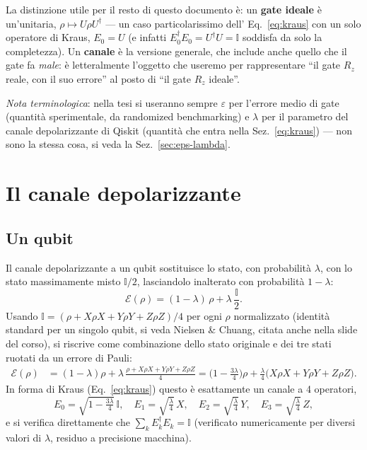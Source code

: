 \documentclass[11pt,a4paper]{article}
\begin{document}
La distinzione utile per il resto di questo documento è: un \textbf{gate ideale} è
un'unitaria, $\rho\mapsto U\rho U^\dagger$ --- un caso particolarissimo dell'
Eq.~\eqref{eq:kraus} con un solo operatore di Kraus, $E_0=U$ (e infatti
$E_0^\dagger E_0=U^\dagger U=\mathbb I$ soddisfa da solo la completezza). Un
\textbf{canale} è la versione generale, che include anche quello che il gate fa
\emph{male}: è letteralmente l'oggetto che useremo per rappresentare ``il gate $R_z$
reale, con il suo errore'' al posto di ``il gate $R_z$ ideale''.

\emph{Nota terminologica}: nella tesi si useranno sempre $\varepsilon$ per l'errore
medio di gate (quantità sperimentale, da randomized benchmarking) e $\lambda$ per il
parametro del canale depolarizzante di Qiskit (quantità che entra nella
Sez.~\eqref{eq:kraus}) --- non sono la stessa cosa, si veda la Sez.~\ref{sec:eps-lambda}.

\section{Il canale depolarizzante}
\label{sec:depol}

\subsection{Un qubit}

Il canale depolarizzante a un qubit sostituisce lo stato, con probabilità $\lambda$,
con lo stato massimamente misto $\mathbb{I}/2$, lasciandolo inalterato con probabilità
$1-\lambda$:
\begin{equation}
\mathcal E(\rho) = (1-\lambda)\,\rho + \lambda\,\frac{\mathbb{I}}{2}.
\end{equation}
Usando $\mathbb{I} = (\rho+X\rho X+Y\rho Y+Z\rho Z)/4$ per ogni $\rho$ normalizzato
(identità standard per un singolo qubit, si veda Nielsen \& Chuang, citata anche nella
slide del corso), si riscrive come combinazione dello stato originale e dei tre stati
ruotati da un errore di Pauli:
\begin{align}
\mathcal E(\rho) &= (1-\lambda)\rho + \lambda\,\frac{\rho+X\rho X+Y\rho Y+Z\rho Z}{4}
= \Big(1-\tfrac{3\lambda}{4}\Big)\rho +
\frac{\lambda}{4}\big(X\rho X+Y\rho Y+Z\rho Z\big).
\end{align}
In forma di Kraus (Eq.~\eqref{eq:kraus}) questo è esattamente un canale a 4 operatori,
\begin{equation}
E_0=\sqrt{1-\tfrac{3\lambda}{4}}\,\mathbb{I},\quad
E_1=\sqrt{\tfrac{\lambda}{4}}\,X,\quad
E_2=\sqrt{\tfrac{\lambda}{4}}\,Y,\quad
E_3=\sqrt{\tfrac{\lambda}{4}}\,Z,
\label{eq:kraus-depol-1q}
\end{equation}
e si verifica direttamente che $\sum_k E_k^\dagger E_k=\mathbb{I}$ (verificato
numericamente per diversi valori di $\lambda$, residuo a precisione macchina).
\end{document}
